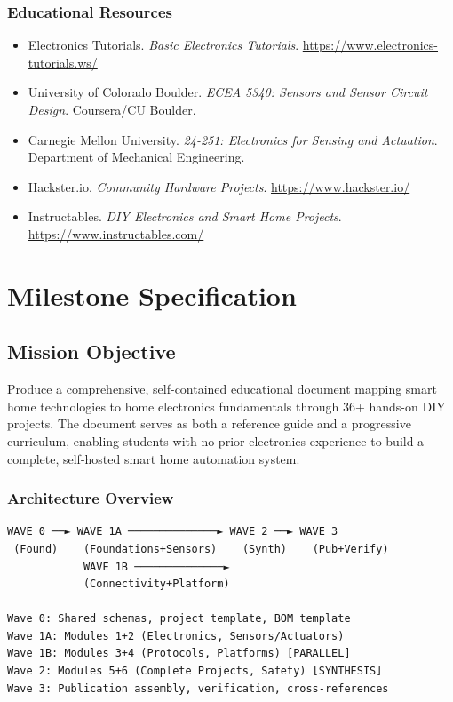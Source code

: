 \documentclass[11pt,letterpaper]{article}
\newcommand{\stageheader}[2]{%
  \noindent\colorbox{#2}{\makebox[\textwidth][l]{%
    \textcolor{white}{\bfseries\sffamily\hspace{6pt}#1\hspace{6pt}}}}%
  \vspace{0.5em}\par%
}
\begin{document}
\subsubsection{Educational Resources}
\begin{itemize}[leftmargin=2em]
  \item Electronics Tutorials. \textit{Basic Electronics Tutorials}. \url{https://www.electronics-tutorials.ws/}
  \item University of Colorado Boulder. \textit{ECEA 5340: Sensors and Sensor Circuit Design}. Coursera/CU Boulder.
  \item Carnegie Mellon University. \textit{24-251: Electronics for Sensing and Actuation}. Department of Mechanical Engineering.
  \item Hackster.io. \textit{Community Hardware Projects}. \url{https://www.hackster.io/}
  \item Instructables. \textit{DIY Electronics and Smart Home Projects}. \url{https://www.instructables.com/}
\end{itemize}

\newpage

\stageheader{STAGE 3 --- MISSION PACKAGE}{tertiary}

\section{Milestone Specification}

\subsection{Mission Objective}

Produce a comprehensive, self-contained educational document mapping smart home technologies to home electronics fundamentals through 36+ hands-on DIY projects. The document serves as both a reference guide and a progressive curriculum, enabling students with no prior electronics experience to build a complete, self-hosted smart home automation system.

\subsubsection{Architecture Overview}

\begin{asciibox}
\begin{verbatim}
WAVE 0 ──► WAVE 1A ──────────────► WAVE 2 ──► WAVE 3
 (Found)    (Foundations+Sensors)    (Synth)    (Pub+Verify)
            WAVE 1B ──────────────►
            (Connectivity+Platform)

Wave 0: Shared schemas, project template, BOM template
Wave 1A: Modules 1+2 (Electronics, Sensors/Actuators)
Wave 1B: Modules 3+4 (Protocols, Platforms) [PARALLEL]
Wave 2: Modules 5+6 (Complete Projects, Safety) [SYNTHESIS]
Wave 3: Publication assembly, verification, cross-references
\end{verbatim}
\end{asciibox}
\end{document}
